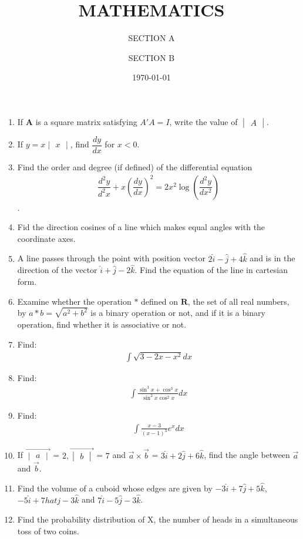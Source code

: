 \documentclass[2pt,-letter paper]{article}
\title{MATHEMATICS}
\author{SECTION A}
\date{\today}
\let\vec\mathbf{}
\let\vec\mathbf{}
\let\vec\mathbf{}
\providecommand{\mydet}[1]{\ensuremath{\begin{vmatrix}#1\end{vmatrix}}}
\providecommand{\brak}[1]{\ensuremath{\left(#1\right)}}
\begin{document}
\maketitle

\begin{enumerate}
\item If $\vec{A}$ is a square matrix satisfying $A'A = I$, write the value of $\mydet{A}$.
\item If $y=x\mydet{x}$, find $\dfrac{dy}{dx}$ for $x < 0$.
\item Find the order and degree (if defined) of the differential equation 
 \begin{align*}
 \dfrac{d^2y}{d^2x}+x\brak{\dfrac{dy}{dx}}^2=2x^2\log\brak{\dfrac{d^2y}{dx^2}}
 \end{align*}.
\item Fid the direction cosines of a line which makes equal angles with the coordinate axes.
 \item A line passes through the point with position vector $2\hat{i}-\hat{j}+4\hat{k}$ and is in the direction of the vector $\hat{i}+\hat{j}-2\hat{k}$. Find the equation of the line in cartesian form.
\author{SECTION B}
\item Examine whether the operation $*$ defined on $\vec{R}$, the set of all real numbers, by $a * b = \sqrt{a^2+b^2}$ is a binary operation or not, and if it is a binary operation, find whether it is associative or not.
\item Find: \begin{align*}\int\sqrt{3-2x-x^2}dx\end{align*}
\item Find: \begin{align*}\int{\frac{\sin^3{x}+\cos^3{x}}{\sin^2{x}\cos^2{x}}}dx\end{align*}
\item Find: \begin{align*}\int{\frac{x-3}{\brak{x-1}^3}}e^xdx\end{align*}
\item If ${\overrightarrow{\mydet{a}}}$ = $2, {\overrightarrow{\mydet{b}}}$ = $7$ and $\overrightarrow{a}\times\overrightarrow{b}$ = $3\hat{i}+2\hat{j}+6\hat{k}$, find the angle between $\overrightarrow{a}$ and $\overrightarrow{b}$.
\item Find the volume of a cuboid whose edges are given by $-3\hat{i}+7\hat{j}+5\hat{k}$,$-5\hat{i}+7hat{j}-3\hat{k}$ and $7\hat{i}-5\hat{j}-3\hat{k}$.
\item Find the probability distribution of X, the number of heads in a simultaneous toss of two coins.

\end{enumerate}
\end{document}
